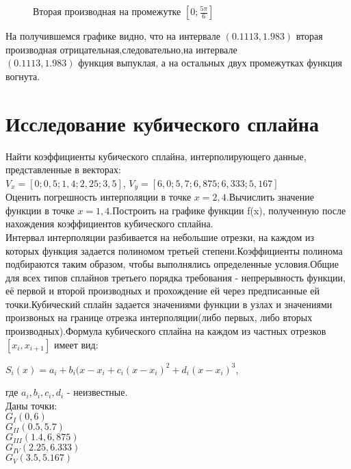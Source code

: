 \documentclass[russian,utf8,nocolumnxxxi,nocolumnxxxii]{eskdtext}
\begin{document}
\begin{enumerate}
    \begin{figure}[h]
        \centering
        \caption{Вторая производная на промежутке $[0;\frac{5\pi}{6}]$}
    \end{figure}
    \newpage
    На получившемся графике видно, что на интервале $(0.1113,1.983)$ вторая производная отрицательная,следовательно,на интервале\\ $(0.1113,1.983)$ функция выпуклая, а на остальных двух промежутках функция вогнута.
\end{enumerate}

\newpage
\section{Исследование кубического сплайна}
Найти коэффициенты кубического сплайна, интерполирующего данные, представленные в векторах:\\
$V_{x}=[0;0,5;1,4;2,25;3,5]$,
$V_{y}=[6,0;5,7;6,875;6,333;5,167]$\\
Оценить погрешность интерполяции в точке $x=2,4$.Вычислить значение функции в точке $x=1,4$.Построить на графике функции f(x), полученную после нахождения коэффициентов кубического сплайна.\\
\indent Интервал интерполяции разбивается на небольшие отрезки, на каждом из которых функция задается полиномом третьей степени.Коэффициенты полинома подбираются таким образом, чтобы выполнялись определенные условия.Общие для всех типов сплайнов третьего порядка требования - непрерывность функции, её первой и второй производных и прохождение ей через предписанные ей точки.Кубический сплайн задается значениями функции в узлах и значениями произвоных на границе отрезка интерполяции(либо первых, либо вторых производных).Формула кубического сплайна на каждом из частных отрезков $[x_i,x_{i+1}]$ имеет вид:\\
\begin{center}
    $S_{i}(x)=a_{i}+b_{i}(x-x_{i}+c_{i}(x-x_{i})^2+d_{i}(x-x_{i})^3$, 
\end{center}
где $a_{i},b_{i},c_{i},d_{i}$ - неизвестные.\\
Даны точки:\\
$G_{I}(0,6)$\\
$G_{II}(0.5,5.7)$\\
$G_{III}(1.4,6,875)$\\
$G_{IV}(2.25,6.333)$\\
$G_{V}(3.5,5.167)$\\
\end{document}
